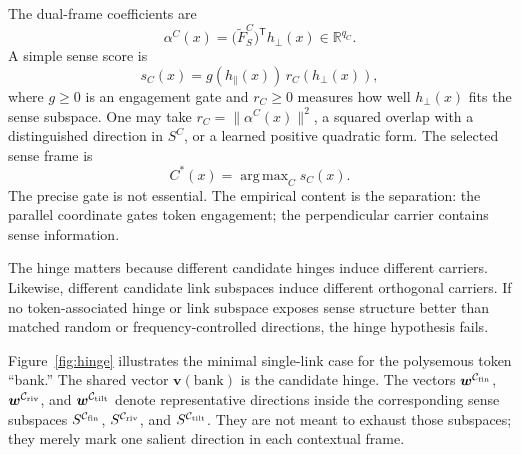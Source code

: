 \documentclass[
  aps,
  reprint,
  superscriptaddress,
  floatfix,
  nofootinbib,
  longbibliography
]{revtex4-2}
\newcommand{\R}{\mathbb{R}}
\newcommand{\T}{^{\mathsf{T}}}
\newcommand{\norm}[1]{\lVert #1 \rVert}
\newcommand{\hpar}{h_{\parallel}}
\newcommand{\hperp}{h_{\perp}}
\DeclareMathOperator*{\argmax}{arg\,max}
\begin{document}
The dual-frame coefficients are
%
\begin{equation}
\label{eq:alpha}
\alpha^C(x)=\bigl(\widetilde F_S^C\bigr)\T\hperp(x)
\in\R^{q_C}.
\end{equation}
%
A simple sense score is
%
\begin{equation}
\label{eq:sense-score}
s_C(x)=g(\hpar(x))\,r_C(\hperp(x)),
\end{equation}
%
where $g\ge0$ is an engagement gate and $r_C\ge0$ measures how well
$\hperp(x)$ fits the sense subspace. One may take
$r_C=\norm{\alpha^C(x)}^2$, a squared overlap with a distinguished
direction in $S^C$, or a learned positive quadratic form. The selected
sense frame is
%
\begin{equation}
\label{eq:selected-frame}
C^*(x)=\argmax_C s_C(x).
\end{equation}
%
The precise gate is not essential. The empirical content is the
separation: the parallel coordinate gates token engagement; the
perpendicular carrier contains sense information.

The hinge matters because different candidate hinges induce different
carriers. Likewise, different candidate link subspaces induce different
orthogonal carriers. If no token-associated hinge or link subspace
exposes sense structure better than matched random or
frequency-controlled directions, the hinge hypothesis fails.

Figure~\ref{fig:hinge} illustrates the minimal single-link case for the
polysemous token ``bank.'' The shared vector
$\bm v(\text{bank})$ is the candidate hinge. The vectors
$\bm w^{\mathcal C_{\rm fin}}$,
$\bm w^{\mathcal C_{\rm riv}}$, and
$\bm w^{\mathcal C_{\rm tilt}}$ denote representative directions inside
the corresponding sense subspaces
$S^{\mathcal C_{\rm fin}}$,
$S^{\mathcal C_{\rm riv}}$, and
$S^{\mathcal C_{\rm tilt}}$. They are not meant to exhaust those
subspaces; they merely mark one salient direction in each contextual
frame.
\end{document}
